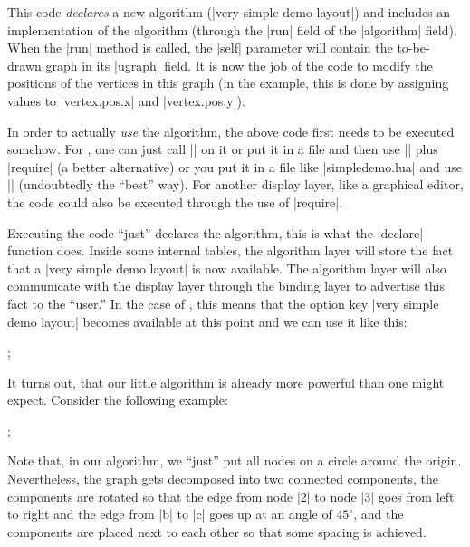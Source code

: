 This code \emph {declares} a new algorithm (|very simple demo layout|)
and includes an implementation of the algorithm (through the |run|
field of the |algorithm| field). When the |run| method is called, the
|self| parameter will contain the to-be-drawn graph in its |ugraph|
field. It is now the job of the code to modify the positions of the
vertices in this graph (in the example, this is done by assigning
values to |vertex.pos.x| and |vertex.pos.y|).

In order to actually \emph{use} the algorithm, the above code first
needs to be executed somehow. For \tikzname, one can just call
|\directlua| on it or put it in a file and then use |\directlua| plus
|require| (a better alternative) or you put it in a file like
|simpledemo.lua| and use || (undoubtedly the
``best'' way). For another display layer, like a graphical editor, the
code could also be executed through the use of |require|.

Executing the code ``just'' declares the algorithm, this is what the
|declare| function does. Inside some internal tables, the algorithm
layer will store the fact that a  |very simple demo layout| is now
available. The algorithm layer will also communicate with the display
layer through the binding layer to advertise this fact to the
``user.'' In the case of \tikzname, this means that the option key
|very simple demo layout| becomes available at this point and we can
use it like this:

\begin{codeexample}[]
  ;
\end{codeexample}

It turns out, that our little algorithm is already more powerful than
one might expect. Consider the following example:
\begin{codeexample}[]
  ;
\end{codeexample}

Note that, in our algorithm, we ``just'' put all nodes on a circle
around the origin. Nevertheless, the graph gets decomposed into two
connected components, the components are rotated so that the edge from
node |2| to node |3| goes from left to right and the edge from |b| to
|c| goes up at an angle of $45^\circ$, and the components are placed
next to each other so that some spacing is achieved.

